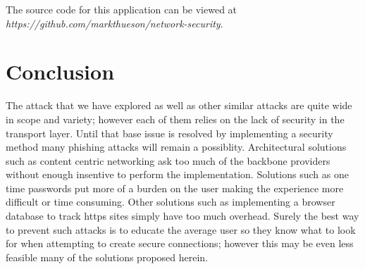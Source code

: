 \documentclass{article}
\begin{document}
The source code for this application can be viewed at {\em https://github.com/markthueson/network-security}.

\section{Conclusion}
The attack that we have explored as well as other similar attacks are quite wide in scope and variety; however each of them relies on the lack of security in the transport layer.  Until that base issue is resolved by implementing a security method many phishing attacks will remain a possiblity.  Architectural solutions such as content centric networking ask too much of the backbone providers without enough insentive to perform the implementation.  Solutions such as one time passwords put more of a burden on the user making the experience more difficult or time consuming.  Other solutions such as implementing a browser database to track https sites simply have too much overhead.  Surely the best way to prevent such attacks is to educate the average user so they know what to look for when attempting to create secure connections; however this may be even less feasible many of the solutions proposed herein.



\end{document}
